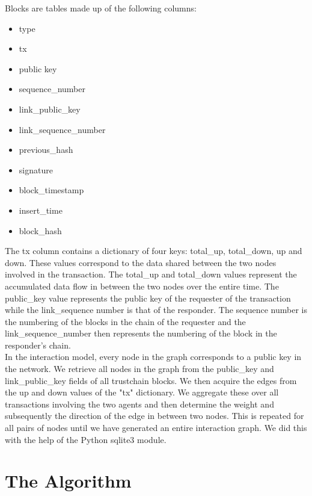 \documentclass[twocolumn]{article}
\theoremstyle{definition}
\theoremstyle{theorem}
\begin{document}
\noindent Blocks are tables made up of the following columns:
\begin{itemize}
\item type
\item tx
\item public key
\item sequence\_{}number
\item link\_{}public\_{}key
\item link\_{}sequence\_{}number
\item previous\_{}hash
\item signature
\item block\_{}timestamp
\item insert\_{}time
\item block\_{}hash
\end{itemize}

\noindent The tx column contains a dictionary of four keys: total\_{}up, total\_{}down, up and down. These values correspond to the data shared between the two nodes involved in the transaction. The total\_{}up and total\_{}down values represent the accumulated data flow in between the two nodes over the entire time. The public\_{}key value represents the public key of the requester of the transaction while the link\_{}sequence number is that of the responder. The sequence number is the numbering of the blocks in the chain of the requester and the link\_{}sequence\_{}number then represents the numbering of the block in the responder's chain. \vspace{1em}\\

\noindent In the interaction model, every node in the graph corresponds to a public key in the network. We retrieve all nodes in the graph from the public\_{}key and link\_{}public\_{}key fields of all trustchain blocks. We then acquire the edges from the up and down values of the "tx" dictionary. We aggregate these over all transactions involving the two agents and then determine the weight and subsequently the direction of the edge in between two nodes. This is repeated for all pairs of nodes until we have generated an entire interaction graph. We did this with the help of the Python sqlite3 module. 
\section{The Algorithm}
\label{sec:TheAlgorithm}
\end{document}
